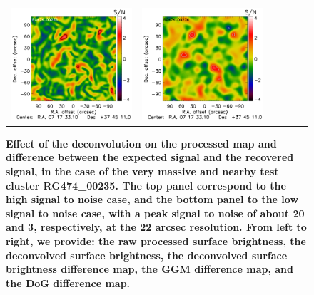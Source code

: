 \documentclass[twocolumn,traditabstract]{aa}
\begin{document}
\begin{figure}[h]
{\begin{tabular}{llllll}
\includegraphics[trim=2.3cm 0.7cm 0cm 0cm, clip=true, scale=1]{Figure/TFcheckGGM_RG474_00236_Ymap_zobs0p4_15_15_45.pdf} & 
\includegraphics[trim=2.3cm 0.7cm 0cm 0cm, clip=true, scale=1]{Figure/TFcheckDoG_RG474_00236_Ymap_zobs0p4_15_15_45.pdf} 
\end{tabular}}
\caption{\footnotesize{{\bf Effect of the deconvolution on the processed map and difference between the expected signal and the recovered signal, in the case of the very massive and nearby test cluster RG474\_00235. The top panel correspond to the high signal to noise case, and the bottom panel to the low signal to noise case, with a peak signal to noise of about 20 and 3, respectively, at the 22 arcsec resolution. From left to right, we provide: the raw processed surface brightness, the deconvolved surface brightness, the deconvolved surface brightness difference map, the GGM difference map, and the DoG difference map.}}}
\label{fig:transfer_function_effect}
\end{figure}
\end{document}
